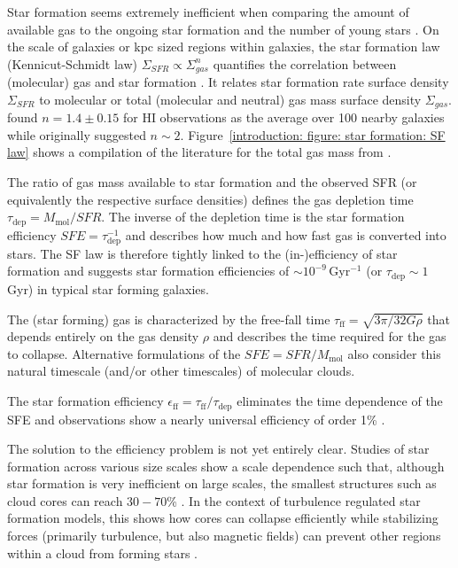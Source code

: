 Star formation seems extremely inefficient when comparing the amount of available gas to the ongoing star formation and the number of young stars \citep[e.g.][]{2007ARA&A..45..565M,2014PhR...539...49K}.
On the scale of galaxies or kpc sized regions within galaxies, the star formation law (Kennicut-Schmidt law) $\Sigma_{SFR} \propto \Sigma_{gas}^n$ quantifies the correlation between (molecular) gas and star formation \citep{1959ApJ...129..243S,Kennicutt:1998id}. It relates star formation rate surface density $\Sigma_{SFR}$ to molecular or total (molecular and neutral) gas mass surface density $\Sigma_{gas}$.
\citet{Kennicutt:1998id} found $n = 1.4 \pm 0.15$ for HI observations as the average over 100 nearby galaxies while \citet{1959ApJ...129..243S} originally suggested $n \sim2$. 
Figure~\ref{introduction: figure: star formation: SF law} shows a compilation of the literature for the total gas mass from \citet{2012ARA&A..50..531K}.

The ratio of gas mass available to star formation and the observed SFR (or equivalently the respective surface densities) defines the gas depletion time $\tau_\mathrm{dep} = M_\mathrm{mol}/SFR$. 
The inverse of the depletion time is the star formation efficiency $SFE = \tau_\mathrm{dep}^{-1}$ and describes how much and how fast gas is converted into stars.
The SF law is therefore tightly linked to the (in-)efficiency of star formation and suggests star formation efficiencies of $\sim 10^{-9}$\,Gyr$^{-1}$ (or $\tau_\mathrm{dep} \sim 1$\,Gyr) in typical star forming galaxies.

The (star forming) gas is characterized by the free-fall time $\tau_\mathrm{ff} = \sqrt{3\pi / 32 G \rho}$ that depends entirely on the gas density $\rho$ and describes the time required for the gas to collapse. Alternative formulations of the $SFE = SFR/M_\mathrm{mol}$ also consider this natural timescale (and/or other timescales) of molecular clouds.

The star formation efficiency $\epsilon_\mathrm{ff} = \tau_\mathrm{ff} / \tau_\mathrm{dep}$ eliminates the time dependence of the SFE \citep{2005ApJ...630..250K} and observations show a nearly universal efficiency of order 1\% \citep[e.g.][]{Krumholz:2012ja,2018ApJ...861L..18U,2017A&A...604A..74S}.

The solution to the efficiency problem is not yet entirely clear. Studies of star formation across various size scales show a scale dependence such that, although star formation is very inefficient on large scales, the smallest structures such as cloud cores can reach $30-70$\% \citep{2013ApJ...763...51F,2014prpl.conf...77P}. In the context of turbulence regulated star formation models, this shows how cores can collapse efficiently while stabilizing forces (primarily turbulence, but also magnetic fields) can prevent other regions within a cloud from forming stars \citep[e.g.][]{2019ApJ...883....2S}.

